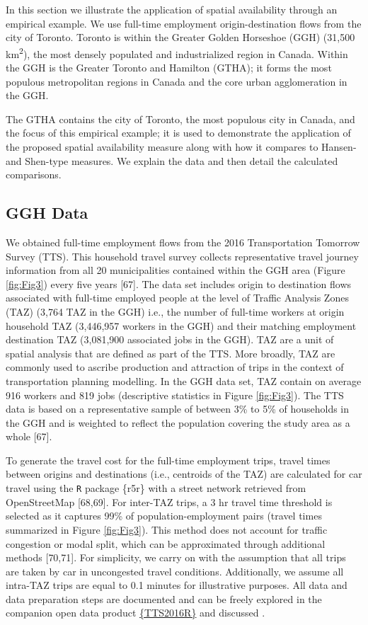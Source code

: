 \documentclass[10pt,letterpaper]{article}
\begin{document}
In this section we illustrate the application of spatial availability
through an empirical example. We use full-time employment
origin-destination flows from the city of Toronto. Toronto is within the
Greater Golden Horseshoe (GGH) (31,500 km\textsuperscript{2}), the most
densely populated and industrialized region in Canada. Within the GGH is
the Greater Toronto and Hamilton (GTHA); it forms the most populous
metropolitan regions in Canada and the core urban agglomeration in the
GGH.

The GTHA contains the city of Toronto, the most populous city in Canada,
and the focus of this empirical example; it is used to demonstrate the
application of the proposed spatial availability measure along with how
it compares to Hansen- and Shen-type measures. We explain the data and
then detail the calculated comparisons.

\hypertarget{ggh-data}{%
\subsection{GGH Data}\label{ggh-data}}

We obtained full-time employment flows from the 2016 Transportation
Tomorrow Survey (TTS). This household travel survey collects
representative travel journey information from all 20 municipalities
contained within the GGH area (Figure \ref{fig:Fig3}) every five years
{[}67{]}. The data set includes origin to destination flows associated
with full-time employed people at the level of Traffic Analysis Zones
(TAZ) (3,764 TAZ in the GGH) i.e., the number of full-time workers at
origin household TAZ (3,446,957 workers in the GGH) and their matching
employment destination TAZ (3,081,900 associated jobs in the GGH). TAZ
are a unit of spatial analysis that are defined as part of the TTS. More
broadly, TAZ are commonly used to ascribe production and attraction of
trips in the context of transportation planning modelling. In the GGH
data set, TAZ contain on average 916 workers and 819 jobs (descriptive
statistics in Figure \ref{fig:Fig3}). The TTS data is based on a
representative sample of between 3\% to 5\% of households in the GGH and
is weighted to reflect the population covering the study area as a whole
{[}67{]}.

To generate the travel cost for the full-time employment trips, travel
times between origins and destinations (i.e., centroids of the TAZ) are
calculated for car travel using the \texttt{R} package \{r5r\} with a
street network retrieved from OpenStreetMap {[}68,69{]}. For inter-TAZ
trips, a 3 hr travel time threshold is selected as it captures 99\% of
population-employment pairs (travel times summarized in Figure
\ref{fig:Fig3}). This method does not account for traffic congestion or
modal split, which can be approximated through additional methods
{[}70,71{]}. For simplicity, we carry on with the assumption that all
trips are taken by car in uncongested travel conditions. Additionally,
we assume all intra-TAZ trips are equal to 0.1 minutes for illustrative
purposes. All data and data preparation steps are documented and can be
freely explored in the companion open data product
\href{https://soukhova.github.io/TTS2016R/}{\{TTS2016R\}} and discussed
.
\end{document}
